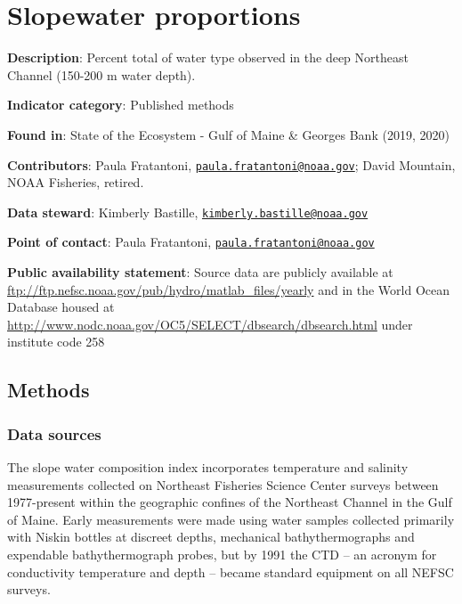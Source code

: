 \documentclass[
]{book}
\begin{document}
\hypertarget{slopewater-proportions}{%
\chapter{Slopewater proportions}\label{slopewater-proportions}}

\textbf{Description}: Percent total of water type observed in the deep Northeast Channel (150-200 m water depth).

\textbf{Indicator category}: Published methods

\textbf{Found in}: State of the Ecosystem - Gulf of Maine \& Georges Bank (2019, 2020)

\textbf{Contributors}: Paula Fratantoni, \href{mailto:paula.fratantoni@noaa.gov}{\nolinkurl{paula.fratantoni@noaa.gov}}; David Mountain, NOAA Fisheries, retired.

\textbf{Data steward}: Kimberly Bastille, \href{mailto:kimberly.bastille@noaa.gov}{\nolinkurl{kimberly.bastille@noaa.gov}}

\textbf{Point of contact}: Paula Fratantoni, \href{mailto:paula.fratantoni@noaa.gov}{\nolinkurl{paula.fratantoni@noaa.gov}}

\textbf{Public availability statement}: Source data are publicly available at \url{ftp://ftp.nefsc.noaa.gov/pub/hydro/matlab_files/yearly} and in the World Ocean Database housed at \url{http://www.nodc.noaa.gov/OC5/SELECT/dbsearch/dbsearch.html} under institute code 258

\hypertarget{methods-36}{%
\section{Methods}\label{methods-36}}

\hypertarget{data-sources-36}{%
\subsection{Data sources}\label{data-sources-36}}

The slope water composition index incorporates temperature and salinity measurements collected on Northeast Fisheries Science Center surveys between 1977-present within the geographic confines of the Northeast Channel in the Gulf of Maine. Early measurements were made using water samples collected primarily with Niskin bottles at discreet depths, mechanical bathythermographs and expendable bathythermograph probes, but by 1991 the CTD -- an acronym for conductivity temperature and depth -- became standard equipment on all NEFSC surveys.
\end{document}

